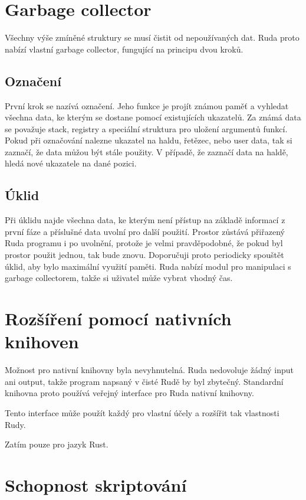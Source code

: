 \documentclass[12pt, a4paper,
twoside,        %
openright
]{report}
\begin{document}
\section{Garbage collector}

Všechny výše zmíněné struktury se musí čistit od nepoužívaných dat. Ruda proto nabízí vlastní garbage collector, fungující na principu dvou kroků.

\subsection{Označení}

První krok se nazívá označení. Jeho funkce je projít známou paměť a vyhledat všechna data, ke kterým se dostane pomocí existujících ukazatelů. Za známá data se považuje stack, registry a speciální struktura pro uložení argumentů funkcí. Pokud při označování nalezne ukazatel na haldu, řetězec, nebo user data, tak si zaznačí, že data můžou být stále použity. V případě, že zaznačí data na haldě, hledá nové ukazatele na dané pozici.

\subsection{Úklid}

Při úklidu najde všechna data, ke kterým není přístup na základě informací z první fáze a příslušné data uvolní pro další použití. Prostor zůstává přiřazený Ruda programu i po uvolnění, protože je velmi pravděpodobné, že pokud byl prostor použit jednou, tak bude znovu. Doporučuji proto periodicky spouštět úklid, aby bylo maximální využití paměti. Ruda nabízí modul pro manipulaci s garbage collectorem, takže si uživatel může vybrat vhodný čas.

\section{Rozšíření pomocí nativních knihoven}

Možnost pro nativní knihovny byla nevyhnutelná. Ruda nedovoluje žádný input ani output, takže program napsaný v čisté Rudě by byl zbytečný. Standardní knihovna proto používá veřejný interface pro Ruda nativní knihovny. 

Tento interface může použít každý pro vlastní účely a rozšířit tak vlastnosti Rudy.

Zatím pouze pro jazyk Rust.

\section{Schopnost skriptování}
\end{document}
